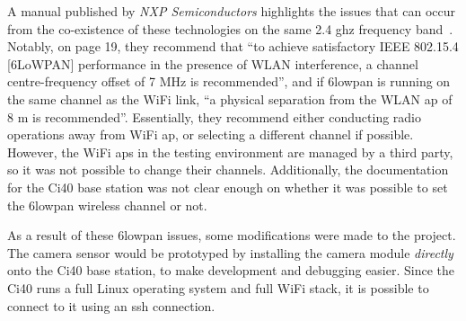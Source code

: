 A manual published by \textit{NXP Semiconductors} highlights the issues that
can occur from the co-existence of these technologies on the same 2.4
\acrshort{ghz} frequency band~\cite{nxp2013ieee802154coexistence}. Notably,
on page 19, they recommend that ``to achieve satisfactory IEEE 802.15.4
[6LoWPAN] performance in the presence of WLAN interference, a channel
centre-frequency offset of 7 MHz is recommended'', and if \gls{6lowpan} is
running on the same channel as the WiFi link, ``a physical separation from
the WLAN \acrfull{ap} of 8 m is recommended''. Essentially, they recommend
either conducting radio operations away from WiFi \acrshort{ap}, or selecting
a different channel if possible. However, the WiFi \acrshort{ap}s in the
testing environment are managed by a third party, so it was not possible to
change their channels. Additionally, the documentation for the Ci40 base
station was not clear enough on whether it was possible to set the
\gls{6lowpan} wireless channel or not.

As a result of these \gls{6lowpan} issues, some modifications were made to
the project. The camera sensor would be prototyped by installing the camera
module \textit{directly} onto the Ci40 base station, to make development and
debugging easier. Since the Ci40 runs a full Linux operating system and full
WiFi stack, it is possible to connect to it using an \acrfull{ssh}
connection.